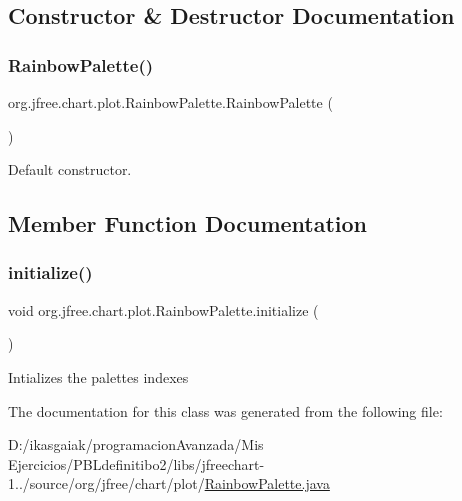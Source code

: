 \subsection{Constructor \& Destructor Documentation}
\mbox{\label{classorg_1_1jfree_1_1chart_1_1plot_1_1_rainbow_palette_a9d1fbb955d394cee115eaa67d7554b38}} 
\subsubsection{\texorpdfstring{Rainbow\+Palette()}{RainbowPalette()}}
{\footnotesize\ttfamily org.\+jfree.\+chart.\+plot.\+Rainbow\+Palette.\+Rainbow\+Palette (\begin{DoxyParamCaption}{ }\end{DoxyParamCaption})}

Default constructor. 

\subsection{Member Function Documentation}
\mbox{\label{classorg_1_1jfree_1_1chart_1_1plot_1_1_rainbow_palette_a1e9eb5dd27d089c858037073eb0ec1ae}} 
\subsubsection{\texorpdfstring{initialize()}{initialize()}}
{\footnotesize\ttfamily void org.\+jfree.\+chart.\+plot.\+Rainbow\+Palette.\+initialize (\begin{DoxyParamCaption}{ }\end{DoxyParamCaption})}

Intializes the palettes indexes 

The documentation for this class was generated from the following file\+:\begin{DoxyCompactItemize}
\item 
D\+:/ikasgaiak/programacion\+Avanzada/\+Mis Ejercicios/\+P\+B\+Ldefinitibo2/libs/jfreechart-\/1../source/org/jfree/chart/plot/\mbox{\hyperlink{_rainbow_palette_8java}{Rainbow\+Palette.\+java}}\end{DoxyCompactItemize}
